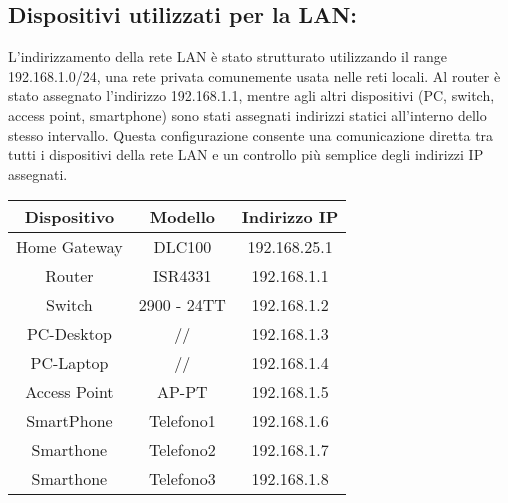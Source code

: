 \documentclass[italian, 12pt, a4paper]{article}
\begin{document}
\subsection{Dispositivi utilizzati per la  LAN:}\label{sec:lan}
L’indirizzamento della rete LAN è stato strutturato utilizzando il range 192.168.1.0/24, una rete privata comunemente usata nelle reti locali. Al router è stato assegnato l’indirizzo 192.168.1.1, mentre agli altri dispositivi (PC, switch, access point, smartphone) sono stati assegnati indirizzi statici all’interno dello stesso intervallo. Questa configurazione consente una comunicazione diretta tra tutti i dispositivi della rete LAN e un controllo più semplice degli indirizzi IP assegnati.
\begin{center}
    \renewcommand{\arraystretch}{1.5} %
    \begin{tabular}{|c|c|c|}
        \hline
        \rowcolor{violet!30}
        Dispositivo & Modello & Indirizzo IP\\
        \hline
        Home Gateway & DLC100 & 192.168.25.1\\
        \hline
        Router & ISR4331 & 192.168.1.1\\
        \hline
        Switch & 2900 - 24TT & 192.168.1.2\\
        \hline
        PC-Desktop & // & 192.168.1.3\\
        \hline
        PC-Laptop & // & 192.168.1.4\\
        \hline
        Access Point & AP-PT & 192.168.1.5\\
        \hline
        SmartPhone & Telefono1 & 192.168.1.6\\
        \hline 
        Smarthone & Telefono2 & 192.168.1.7\\
        \hline 
        Smarthone & Telefono3 & 192.168.1.8\\
        \hline
    \end{tabular}\\[4mm]
\end{center}
\clearpage
\end{document}
